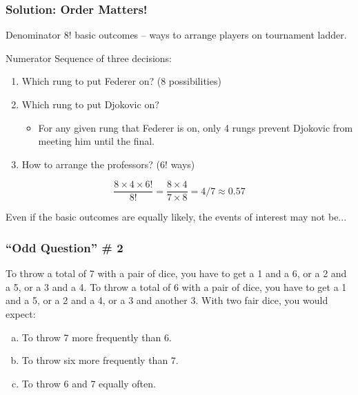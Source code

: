 \documentclass[handout]{beamer}
\begin{document}
\begin{frame}
  \frametitle{Solution: Order Matters!}
  \begin{block}{Denominator}
	$8!$ basic outcomes -- ways to arrange players on tournament ladder.
  \end{block}
  \begin{block}{Numerator}
   Sequence of three decisions:
   \begin{enumerate}
    \item Which rung to put Federer on? (8 possibilities)
    \item Which rung to put Djokovic on? 
      \begin{itemize}
        \item For any given rung that Federer is on, only 4 rungs prevent Djokovic from meeting him until the final.
      \end{itemize}
    \item How to arrange the professors? ($6!$ ways)
   \end{enumerate}
  \end{block}
\alert{$$\frac{8 \times 4 \times 6!}{8!} = \frac{8\times 4}{7\times 8} = 4/7 \approx 0.57$$}

\end{frame}
\begin{frame}

\centering \Huge Even if the basic outcomes are equally likely, the events of interest may not be...


\end{frame}
\begin{frame}
\frametitle{``Odd Question'' \# 2}
To throw a total of 7 with a pair of dice, you have to get a 1 and a 6, or a 2 and a 5, or a 3 and a 4.
To throw a total of 6 with a pair of dice, you have to get a 1 and a 5, or a 2 and a 4, or a 3 and another 3.
	\vspace{1em}
	With two fair dice, you would expect:
		\begin{enumerate}[(a)]
			\item To throw 7 more frequently than 6.
			\item To throw six more frequently than 7.
			\item To throw 6 and 7 equally often.
		\end{enumerate}
\end{frame}
\end{document}
